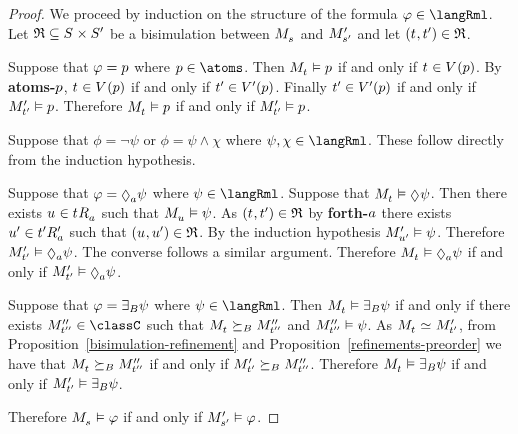 \begin{proof}
We proceed by induction on the structure of the formula $\phi \in \langRml$.
Let $\bisimulation \subseteq \kStates \times \kStatesP$ be a bisimulation between $\kPModel{\kStateS}$ and ${M^{\prime}_{{s}^{\prime}}}$ and let $(\kStateT, \kStateTP) \in \bisimulation$.

Suppose that $\varphi = p$ where $\atomP \in \atoms$.
Then $\kPModel{\kStateT} \entails \atomP$ if and only if $\kStateT \in \kValuation(\atomP)$.
By {\bf atoms-$p$}, $\kStateT \in \kValuation(\atomP)$ if and only if ${t}^{\prime} \in {V^{\prime}}(p)$.
Finally ${t}^{\prime} \in {V^{\prime}}(p)$ if and only if ${M^{\prime}_{{t}^{\prime}}} \vDash p$.
Therefore $\kPModel{\kStateT} \entails \atomP$ if and only if ${M^{\prime}_{{t}^{\prime}}} \vDash p$.

Suppose that $\phi = \lnot \psi$ or $\phi = \psi \land \chi$ where $\psi, \chi \in \langRml$. These follow directly from the induction hypothesis.

Suppose that $\phi = \possibleA \psi$ where $\psi \in \langRml$.
Suppose that $\kPModel{\kStateT} \entails \possible \psi$. 
Then there exists $\kStateU \in \kSuccessorsA{\kStateT}$ such that $\kPModel{\kStateU} \entails \psi$.
As $(\kStateT, \kStateTP) \in \bisimulation$ by {\bf forth-$a$} there exists ${u}^{\prime} \in {{t}^{\prime}} {R^{\prime}_{a}}$ such that $(\kStateU, \kStateUP) \in \bisimulation$.
By the induction hypothesis ${M^{\prime}_{{u}^{\prime}}} \vDash \psi$.
Therefore $\kPModelP{\kStateTP} \entails \possibleA \psi$.
The converse follows a similar argument.
Therefore $\kPModel{\kStateT} \entails \possibleA \psi$ if and only if $\kPModelP{\kStateTP} \entails \possibleA \psi$.

Suppose that $\varphi = {\exists_{B}} \psi$ where $\psi \in \langRml$.
Then $\kPModel{\kStateT} \entails \somerefsBs \psi$ if and only if there exists $\kPModelPP{\kStateTPP} \in \classC$ such that $\kPModel{\kStateT} \simulatesBs \kPModelPP{\kStateTPP}$ and ${M^{\prime\prime}_{{t}^{\prime\prime}}} \vDash \psi$.
As $\kPModel{\kStateT} \bisimilar \kPModelP{\kStateTP}$, from Proposition~\ref{bisimulation-refinement} and Proposition~\ref{refinements-preorder} we have that $\kPModel{\kStateT} \simulatesBs \kPModelPP{\kStateTPP}$ if and only if ${M^{\prime}_{{t}^{\prime}}} \succeq_{B} {M^{\prime\prime}_{{t}^{\prime\prime}}}$.
Therefore $\kPModel{\kStateT} \entails \somerefsBs \psi$ if and only if ${M^{\prime}_{{t}^{\prime}}} \vDash {\exists_{B}} \psi$.

Therefore $\kPModel{\kStateS} \entails \phi$ if and only if ${M^{\prime}_{{s}^{\prime}}} \vDash \varphi$.
\end{proof}

